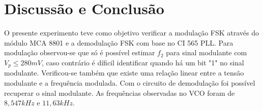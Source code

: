 \newpage
\section{Discussão e Conclusão}
O presente experimento teve como objetivo verificar a modulação FSK através do módulo MCA 8801 e a demodulação FSK com base no CI 565 PLL.
Para modulação observou-se que só é possível estimar $f_2$ para sinal modulante com $V_p\leq280mV$, caso contrário é díficil identificar quando há um bit "1" no sinal modulante.
Verificou-se também que existe uma relação linear entre a tensão modulante e a frequência modulada.
Com o circuito de demodulação foi possível recuperar o sinal modulante.
As frequências observadas no VCO foram de $8,547 kHz$ e $11,63 kHz$.

